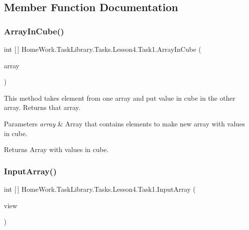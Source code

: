 \subsection{Member Function Documentation}
\mbox{\label{class_home_work_1_1_task_library_1_1_tasks_1_1_lesson4_1_1_task1_a205b22e98ee24fcc596770e77a5df98b}} 
\subsubsection{\texorpdfstring{ArrayInCube()}{ArrayInCube()}}
{\footnotesize\ttfamily int \mbox{[}$\,$\mbox{]} Home\+Work.\+Task\+Library.\+Tasks.\+Lesson4.\+Task1.\+Array\+In\+Cube (\begin{DoxyParamCaption}\item[{int \mbox{[}$\,$\mbox{]}}]{array }\end{DoxyParamCaption})\hspace{0.3cm}{\ttfamily [private]}}



This method takes element from one array and put value in cube in the other array. Returns that array. 


\begin{DoxyParams}{Parameters}
{\em array} & Array that contains elements to make new array with values in cube.\\
\hline
\end{DoxyParams}
\begin{DoxyReturn}{Returns}
Array with values in cube.
\end{DoxyReturn}
\mbox{\label{class_home_work_1_1_task_library_1_1_tasks_1_1_lesson4_1_1_task1_abfe0732e050f4679105d46c1ec3bb27a}} 
\subsubsection{\texorpdfstring{InputArray()}{InputArray()}}
{\footnotesize\ttfamily int \mbox{[}$\,$\mbox{]} Home\+Work.\+Task\+Library.\+Tasks.\+Lesson4.\+Task1.\+Input\+Array (\begin{DoxyParamCaption}\item[{I\+Information}]{view }\end{DoxyParamCaption})\hspace{0.3cm}{\ttfamily [private]}}



